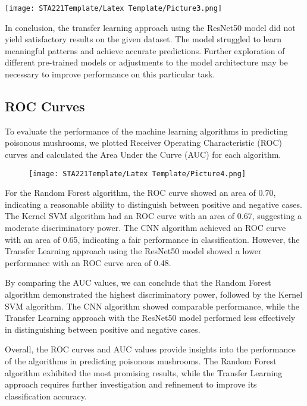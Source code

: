\documentclass{article}
\begin{document}
\begin{table}[h]
\centering
    \texttt{[image: STA221Template/Latex Template/Picture3.png]}
\end{table}

In conclusion, the transfer learning approach using the ResNet50 model did not yield satisfactory results on the given dataset. The model struggled to learn meaningful patterns and achieve accurate predictions. Further exploration of different pre-trained models or adjustments to the model architecture may be necessary to improve performance on this particular task.

\subsection{ROC Curves}
To evaluate the performance of the machine learning algorithms in predicting poisonous mushrooms, we plotted Receiver Operating Characteristic (ROC) curves and calculated the Area Under the Curve (AUC) for each algorithm.

\begin{figure}[h]
\centering
    \texttt{[image: STA221Template/Latex Template/Picture4.png]}
\end{figure}

For the Random Forest algorithm, the ROC curve showed an area of 0.70, indicating a reasonable ability to distinguish between positive and negative cases. The Kernel SVM algorithm had an ROC curve with an area of 0.67, suggesting a moderate discriminatory power. The CNN algorithm achieved an ROC curve with an area of 0.65, indicating a fair performance in classification. However, the Transfer Learning approach using the ResNet50 model showed a lower performance with an ROC curve area of 0.48.

By comparing the AUC values, we can conclude that the Random Forest algorithm demonstrated the highest discriminatory power, followed by the Kernel SVM algorithm. The CNN algorithm showed comparable performance, while the Transfer Learning approach with the ResNet50 model performed less effectively in distinguishing between positive and negative cases.

Overall, the ROC curves and AUC values provide insights into the performance of the algorithms in predicting poisonous mushrooms. The Random Forest algorithm exhibited the most promising results, while the Transfer Learning approach requires further investigation and refinement to improve its classification accuracy.
\end{document}
